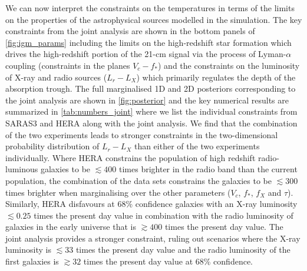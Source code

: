 We can now interpret the constraints on the temperatures in terms of the limits on the properties of the astrophysical sources modelled in the simulation. 
The key constraints from the joint analysis are shown in the  bottom panels of \cref{fig:igm_params} including the limits  on the high-redshift star formation which drives the high-redshift portion of the 21-cm signal via the process of Lyman-$\alpha$ coupling (constraints in the planes $V_c - f_*$) and the constraints on the luminosity of X-ray and radio sources ($L_r - L_X$) which primarily regulates the depth of the absorption trough. The full marginalised 1D and 2D posteriors corresponding to the joint analysis are shown in \cref{fig:posterior} and the key numerical results are summarized in \cref{tab:numbers_joint} where we list the individual constraints from SARAS3 and HERA along with the joint analysis. We find that the combination of the two experiments leads to stronger constraints in the two-dimensional probability distribution of $L_r - L_X$ than either of the two experiments individually. Where HERA constrains the population of high redshift radio-luminous galaxies to be $\lesssim400$ times brighter in the radio band than the current population, the combination of the data sets constrains the galaxies to be $\lesssim300$ times brighter when marginalising over the other parameters ($V_c$, $f_*$, $f_X$ and $\tau$). Similarly, HERA disfavours at 68\% confidence galaxies with an X-ray luminosity $\lesssim 0.25$ times the present day value in combination with the radio luminosity of galaxies in the early universe that is $\gtrsim 400$ times the present day value. The joint analysis provides a stronger constraint, ruling out scenarios where the X-ray luminosity is $\lesssim 33$ times the present day value and the radio luminosity of the first galaxies is $\gtrsim32$ times the present day value at 68\% confidence.


